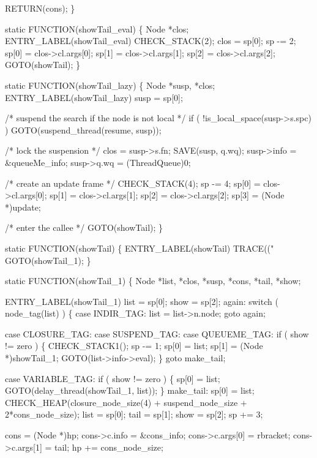     RETURN(cons);
\}

static
FUNCTION(showTail_eval)
\{
    Node *clos;
 ENTRY_LABEL(showTail_eval)
    CHECK_STACK(2);
    clos  = sp[0];
    sp   -= 2;
    sp[0] = clos->cl.args[0];
    sp[1] = clos->cl.args[1];
    sp[2] = clos->cl.args[2];
    GOTO(showTail);
\}

static
FUNCTION(showTail_lazy)
\{
    Node *susp, *clos;
 ENTRY_LABEL(showTail_lazy)
    susp = sp[0];

    /* suspend the search if the node is not local */
    if ( !is_local_space(susp->s.spc) )
        GOTO(suspend_thread(resume, susp));

    /* lock the suspension */
    clos = susp->s.fn;
    SAVE(susp, q.wq);
    susp->info = &queueMe_info;
    susp->q.wq = (ThreadQueue)0;

    /* create an update frame */
    CHECK_STACK(4);
    sp   -= 4;
    sp[0] = clos->cl.args[0];
    sp[1] = clos->cl.args[1];
    sp[2] = clos->cl.args[2];
    sp[3] = (Node *)update;

    /* enter the callee */
    GOTO(showTail);
\}

static
FUNCTION(showTail)
\{
 ENTRY_LABEL(showTail)
    TRACE(("%
    GOTO(showTail_1);
\}

static
FUNCTION(showTail_1)
\{
    Node *list, *clos, *susp, *cons, *tail, *show;

 ENTRY_LABEL(showTail_1)
    list = sp[0];
    show = sp[2];
 again:
    switch ( node_tag(list) )
    \{
    case INDIR_TAG:
        list = list->n.node;
        goto again;

    case CLOSURE_TAG:
    case SUSPEND_TAG:
    case QUEUEME_TAG:
        if ( show != zero )
        \{
            CHECK_STACK1();
            sp -= 1;
            sp[0] = list;
            sp[1] = (Node *)showTail_1;
            GOTO(list->info->eval);
        \}
        goto make_tail;

    case VARIABLE_TAG:
        if ( show != zero )
        \{
            sp[0] = list;
            GOTO(delay_thread(showTail_1, list));
        \}
    make_tail:
        sp[0] = list;
        CHECK_HEAP(closure_node_size(4) + suspend_node_size
                   + 2*cons_node_size);
        list = sp[0];
        tail = sp[1];
        show = sp[2];
        sp  += 3;

        cons            = (Node *)hp;
        cons->c.info    = &cons_info;
        cons->c.args[0] = rbracket;
        cons->c.args[1] = tail;
        hp             += cons_node_size;

